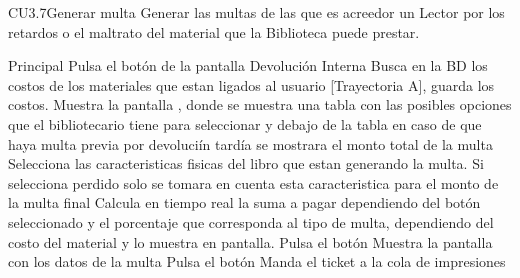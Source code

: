 
	\begin{UseCase}{CU3.7}{Generar multa}{
		Generar las multas de las que es acreedor un Lector por los retardos o el maltrato del material que la Biblioteca puede prestar.
	}
	\end{UseCase}
	\begin{UCtrayectoria}{Principal}
		\UCpaso[\UCactor]Pulsa el botón  de la pantalla Devolución Interna
		\UCpaso[\UCsist]Busca en la BD los costos de los materiales que estan ligados al usuario [Trayectoria A], guarda los costos.
		\UCpaso[\UCsist]Muestra la pantalla , donde se muestra una tabla con las posibles opciones que el bibliotecario tiene para seleccionar y debajo de la tabla en caso de que haya multa previa por devoluciín tardía se mostrara el monto total de la multa
		\UCpaso[\UCactor]Selecciona las caracteristicas fisicas del libro que estan generando la multa.
		\UCpaso[\UCsist]Si selecciona perdido solo se tomara en cuenta esta caracteristica para el monto de la multa final
		\UCpaso[\UCsist]Calcula en tiempo real la suma a pagar dependiendo del botón seleccionado y el porcentaje que corresponda al tipo de multa, dependiendo del costo del material y lo muestra en pantalla.
		\UCpaso[\UCactor]Pulsa el botón  
		\UCpaso[\UCsist]Muestra la pantalla  con los datos de la multa
		\UCpaso[\UCactor]Pulsa el botón 
		\UCpaso[\UCsist]Manda el ticket a la cola de impresiones 
	\end{UCtrayectoria}
			
